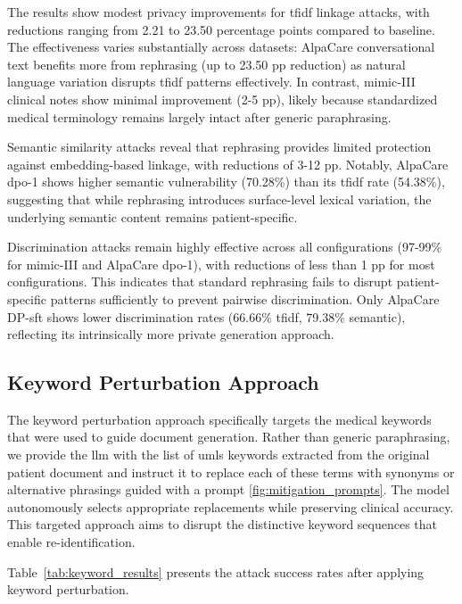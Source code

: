 The results show modest privacy improvements for \gls{tfidf} linkage attacks, with reductions ranging from 2.21 to 23.50 percentage points compared to baseline. The effectiveness varies substantially across datasets: AlpaCare conversational text benefits more from rephrasing (up to 23.50 pp reduction) as natural language variation disrupts \gls{tfidf} patterns effectively. In contrast, \gls{mimic}-III clinical notes show minimal improvement (2-5 pp), likely because standardized medical terminology remains largely intact after generic paraphrasing.

Semantic similarity attacks reveal that rephrasing provides limited protection against embedding-based linkage, with reductions of 3-12 pp. Notably, AlpaCare \gls{dpo}-1 shows higher semantic vulnerability (70.28\%) than its \gls{tfidf} rate (54.38\%), suggesting that while rephrasing introduces surface-level lexical variation, the underlying semantic content remains patient-specific.

Discrimination attacks remain highly effective across all configurations (97-99\% for \gls{mimic}-III and AlpaCare \gls{dpo}-1), with reductions of less than 1 pp for most configurations. This indicates that standard rephrasing fails to disrupt patient-specific patterns sufficiently to prevent pairwise discrimination. Only AlpaCare DP-\gls{sft} shows lower discrimination rates (66.66\% \gls{tfidf}, 79.38\% semantic), reflecting its intrinsically more private generation approach.

\subsection{Keyword Perturbation Approach}
\label{subsec:keyword_perturbation}

The keyword perturbation approach specifically targets the medical keywords that were used to guide document generation. Rather than generic paraphrasing, we provide the \gls{llm} with the list of \gls{umls} keywords extracted from the original patient document and instruct it to replace each of these terms with synonyms or alternative phrasings guided with a prompt \ref{fig:mitigation_prompts}. The model autonomously selects appropriate replacements while preserving clinical accuracy. This targeted approach aims to disrupt the distinctive keyword sequences that enable re-identification.

Table~\ref{tab:keyword_results} presents the attack success rates after applying keyword perturbation.

